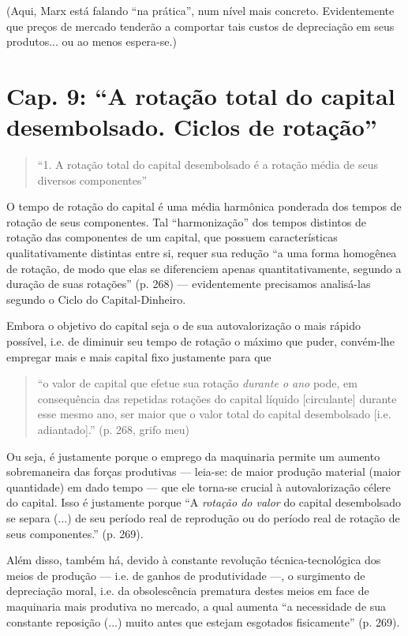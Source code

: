 (Aqui, Marx está falando ``na prática'', num nível mais concreto. Evidentemente que preços de mercado tenderão a comportar tais custos de depreciação em seus produtos... ou ao menos espera-se.)

\section{Cap. 9: ``A rotação total do capital desembolsado. Ciclos de rotação''}
\begin{quote}
``1. A rotação total do capital desembolsado é a rotação média de seus diversos componentes'' \parencite[p. 267]{Marx2014}
\end{quote}

O tempo de rotação do capital é uma média harmônica ponderada dos tempos de rotação de seus componentes. Tal ``harmonização'' dos tempos distintos de rotação das componentes de um capital, que possuem características qualitativamente distintas entre si, requer sua redução ``a uma forma homogênea de rotação, de modo que elas se diferenciem apenas quantitativamente, segundo a duração de suas rotações'' (p. 268) — evidentemente precisamos analisá-las segundo o Ciclo do Capital-Dinheiro. 

Embora o objetivo do capital seja o de sua autovalorização o mais rápido possível, i.e. de diminuir seu tempo de rotação o máximo que puder, convém-lhe empregar mais e mais capital fixo justamente para que
\begin{quote}
``o valor de capital que efetue sua rotação \textit{durante o ano} pode, em consequência das repetidas rotações do capital líquido [circulante] durante esse mesmo ano, ser maior que o valor total do capital desembolsado [i.e. adiantado].'' (p. 268, grifo meu)
\end{quote}

Ou seja, é justamente porque o emprego da maquinaria permite um aumento sobremaneira das forças produtivas — leia-se: de maior produção material (maior quantidade) em dado tempo — que ele torna-se crucial à autovalorização célere do capital. Isso é justamente porque ``A \textit{rotação do valor} do capital desembolsado se separa (...) de seu período real de reprodução ou do período real de rotação de seus componentes.'' (p. 269).

Além disso, também há, devido à constante revolução técnica-tecnológica dos meios de produção — i.e. de ganhos de produtividade —, o surgimento de depreciação moral, i.e. da obsolescência prematura destes meios em face de maquinaria mais produtiva no mercado, a qual aumenta ``a necessidade de sua constante reposição (...) muito antes que estejam esgotados fisicamente'' (p. 269).

